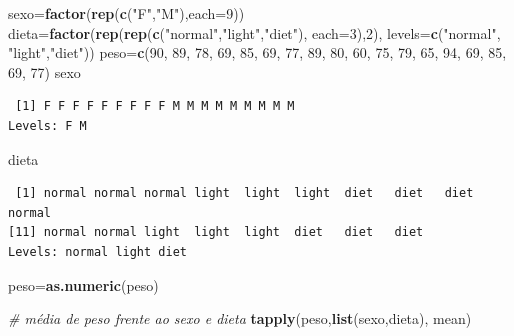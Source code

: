 \documentclass[12pt,brazil,oneside]{book}
\newenvironment{Shaded}{\begin{snugshade}}{\end{snugshade}}
\newcommand{\CommentTok}[1]{\textcolor[rgb]{0.56,0.35,0.01}{\textit{#1}}}
\newcommand{\DataTypeTok}[1]{\textcolor[rgb]{0.13,0.29,0.53}{#1}}
\newcommand{\DecValTok}[1]{\textcolor[rgb]{0.00,0.00,0.81}{#1}}
\newcommand{\KeywordTok}[1]{\textcolor[rgb]{0.13,0.29,0.53}{\textbf{#1}}}
\newcommand{\NormalTok}[1]{#1}
\newcommand{\StringTok}[1]{\textcolor[rgb]{0.31,0.60,0.02}{#1}}
\begin{document}
\begin{Shaded}
\begin{Highlighting}[]
\NormalTok{sexo=}\KeywordTok{factor}\NormalTok{(}\KeywordTok{rep}\NormalTok{(}\KeywordTok{c}\NormalTok{(}\StringTok{"F"}\NormalTok{,}\StringTok{"M"}\NormalTok{),}\DataTypeTok{each=}\DecValTok{9}\NormalTok{))}
\NormalTok{dieta=}\KeywordTok{factor}\NormalTok{(}\KeywordTok{rep}\NormalTok{(}\KeywordTok{rep}\NormalTok{(}\KeywordTok{c}\NormalTok{(}\StringTok{"normal"}\NormalTok{,}\StringTok{"light"}\NormalTok{,}\StringTok{"diet"}\NormalTok{), }\DataTypeTok{each=}\DecValTok{3}\NormalTok{),}\DecValTok{2}\NormalTok{), }
\DataTypeTok{levels=}\KeywordTok{c}\NormalTok{(}\StringTok{"normal"}\NormalTok{, }\StringTok{"light"}\NormalTok{,}\StringTok{"diet"}\NormalTok{))}
\NormalTok{peso=}\KeywordTok{c}\NormalTok{(}\DecValTok{90}\NormalTok{, }\DecValTok{89}\NormalTok{, }\DecValTok{78}\NormalTok{, }\DecValTok{69}\NormalTok{, }\DecValTok{85}\NormalTok{, }\DecValTok{69}\NormalTok{, }\DecValTok{77}\NormalTok{, }\DecValTok{89}\NormalTok{, }\DecValTok{80}\NormalTok{, }\DecValTok{60}\NormalTok{, }\DecValTok{75}\NormalTok{, }\DecValTok{79}\NormalTok{, }\DecValTok{65}\NormalTok{, }\DecValTok{94}\NormalTok{,}
       \DecValTok{69}\NormalTok{, }\DecValTok{85}\NormalTok{, }\DecValTok{69}\NormalTok{, }\DecValTok{77}\NormalTok{)}
\NormalTok{sexo}
\end{Highlighting}
\end{Shaded}

\begin{verbatim}
 [1] F F F F F F F F F M M M M M M M M M
Levels: F M
\end{verbatim}

\begin{Shaded}
\begin{Highlighting}[]
\NormalTok{dieta}
\end{Highlighting}
\end{Shaded}

\begin{verbatim}
 [1] normal normal normal light  light  light  diet   diet   diet   normal
[11] normal normal light  light  light  diet   diet   diet  
Levels: normal light diet
\end{verbatim}

\begin{Shaded}
\begin{Highlighting}[]
\NormalTok{peso=}\KeywordTok{as.numeric}\NormalTok{(peso)}

\CommentTok{# média de peso frente ao sexo e dieta}
\KeywordTok{tapply}\NormalTok{(peso,}\KeywordTok{list}\NormalTok{(sexo,dieta), mean)}
\end{Highlighting}
\end{Shaded}
\end{document}
